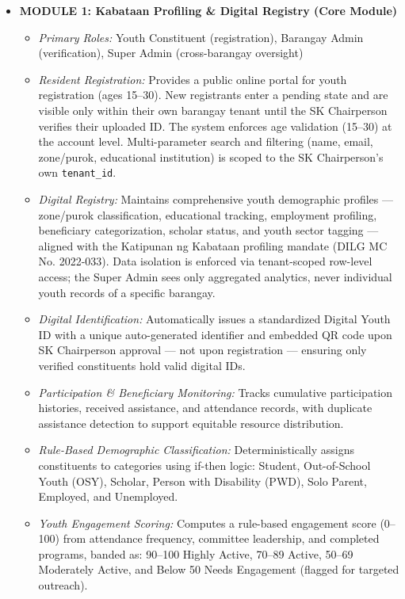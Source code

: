 \begin{itemize}
    \item \textbf{MODULE 1: Kabataan Profiling \& Digital Registry (Core Module)}
    \begin{itemize}
        \item \textit{Primary Roles:} Youth Constituent (registration), Barangay Admin (verification), Super Admin (cross-barangay oversight)
        \item \textit{Resident Registration:} Provides a public online portal for youth registration (ages 15--30). New registrants enter a pending state and are visible only within their own barangay tenant until the SK Chairperson verifies their uploaded ID. The system enforces age validation (15--30) at the account level. Multi-parameter search and filtering (name, email, zone/purok, educational institution) is scoped to the SK Chairperson's own \texttt{tenant\_id}.
        \item \textit{Digital Registry:} Maintains comprehensive youth demographic profiles --- zone/purok classification, educational tracking, employment profiling, beneficiary categorization, scholar status, and youth sector tagging --- aligned with the Katipunan ng Kabataan profiling mandate (DILG MC No. 2022-033). Data isolation is enforced via tenant-scoped row-level access; the Super Admin sees only aggregated analytics, never individual youth records of a specific barangay.
        \item \textit{Digital Identification:} Automatically issues a standardized Digital Youth ID with a unique auto-generated identifier and embedded QR code upon SK Chairperson approval --- not upon registration --- ensuring only verified constituents hold valid digital IDs.
        \item \textit{Participation \& Beneficiary Monitoring:} Tracks cumulative participation histories, received assistance, and attendance records, with duplicate assistance detection to support equitable resource distribution.
        \item \textit{Rule-Based Demographic Classification:} Deterministically assigns constituents to categories using if-then logic: Student, Out-of-School Youth (OSY), Scholar, Person with Disability (PWD), Solo Parent, Employed, and Unemployed.
        \item \textit{Youth Engagement Scoring:} Computes a rule-based engagement score (0--100) from attendance frequency, committee leadership, and completed programs, banded as: 90--100 Highly Active, 70--89 Active, 50--69 Moderately Active, and Below 50 Needs Engagement (flagged for targeted outreach).
    \end{itemize}


\end{itemize}
